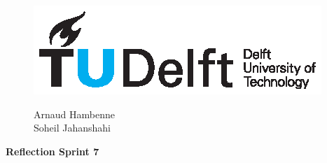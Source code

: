 \documentclass[11pt]{article}
\begin{document}
\thispagestyle{fancy}
\begin{figure}
    \begin{minipage}[H]{0.33\textwidth}
		\vspace{0.3cm}
		\includegraphics[scale=0.8]{img/TUDelftLogo.eps}
	\end{minipage}
	\begin{minipage}[H]{0.34\textwidth}
		\begin{center}
			\selectfont \textcolor{blue}{}
		\end{center}
		
	
	\end{minipage}
	\begin{minipage}[H]{0.33\textwidth}
			\begin{flushright}

				\small{Arnaud Hambenne }\\
				\small{Soheil Jahanshahi }\\
				

			\end{flushright}
			
	\end{minipage}
\end{figure}


\begin{minipage}[H]{\textwidth}
\vspace{0.3cm}
		\begin{center}
		
		\vspace{0.3cm}
			\Large{\selectfont \textbf{Reflection Sprint 7}}\\
		\vspace{0.3cm}	
		
		\vspace{0.7cm}	
		\end{center}
	\end{minipage}
\end{document}

